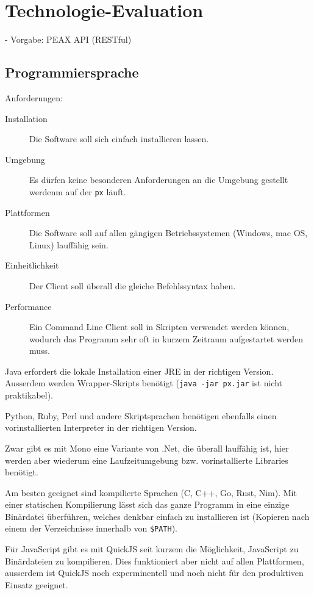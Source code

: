 \section{Technologie-Evaluation}

- Vorgabe: PEAX API (RESTful)

\subsection{Programmiersprache}

Anforderungen:

\begin{description}
    \item[Installation] Die Software soll sich einfach installieren lassen.
    \item[Umgebung] Es dürfen keine besonderen Anforderungen an die Umgebung gestellt werdenm auf der \texttt{px} läuft.
    \item[Plattformen] Die Software soll auf allen gängigen Betriebssystemen (Windows, mac OS, Linux) lauffähig sein.
    \item[Einheitlichkeit] Der Client soll überall die gleiche Befehlssyntax haben.
    \item[Performance] Ein Command Line Client soll in Skripten verwendet werden können, wodurch das Programm sehr oft in kurzem Zeitraum aufgestartet werden muss.
\end{description}

Java erfordert die lokale Installation einer JRE in der richtigen Version. Ausserdem werden Wrapper-Skripts benötigt (\texttt{java -jar px.jar} ist nicht praktikabel).

Python, Ruby, Perl und andere Skriptsprachen benötigen ebenfalls einen vorinstallierten Interpreter in der richtigen Version.

Zwar gibt es mit Mono eine Variante von .Net, die überall lauffähig ist, hier werden aber wiederum eine Laufzeitumgebung bzw. vorinstallierte Libraries benötigt.

Am besten geeignet sind kompilierte Sprachen (C, C++, Go, Rust, Nim). Mit einer statischen Kompilierung lässt sich das ganze Programm in eine einzige Binärdatei überführen, welches denkbar einfach zu installieren ist (Kopieren nach einem der Verzeichnisse innerhalb von \texttt{\$PATH}).

Für JavaScript gibt es mit QuickJS seit kurzem die Möglichkeit, JavaScript zu Binärdateien zu kompilieren. Dies funktioniert aber nicht auf allen Plattformen, ausserdem ist QuickJS noch experminentell und noch nicht für den produktiven Einsatz geeignet.

